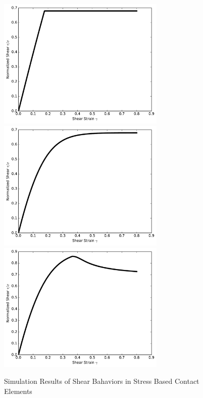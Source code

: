 \begin{figure}[H]
  \centering
  \includegraphics[width = 8cm]{./Figure-files/Day3/Contact_Examples/shear_perfectly_plastic.pdf}
  \includegraphics[width = 8cm]{./Figure-files/Day3/Contact_Examples/shear_hard.pdf}
  \includegraphics[width = 8cm]{./Figure-files/Day3/Contact_Examples/shear_hard_soft.pdf}
  \caption{Simulation Results of Shear Bahaviors in Stress Based Contact Elements}
  \label{fig_soft_hard_contact_shear}
\end{figure}






\clearpage
\newpage

